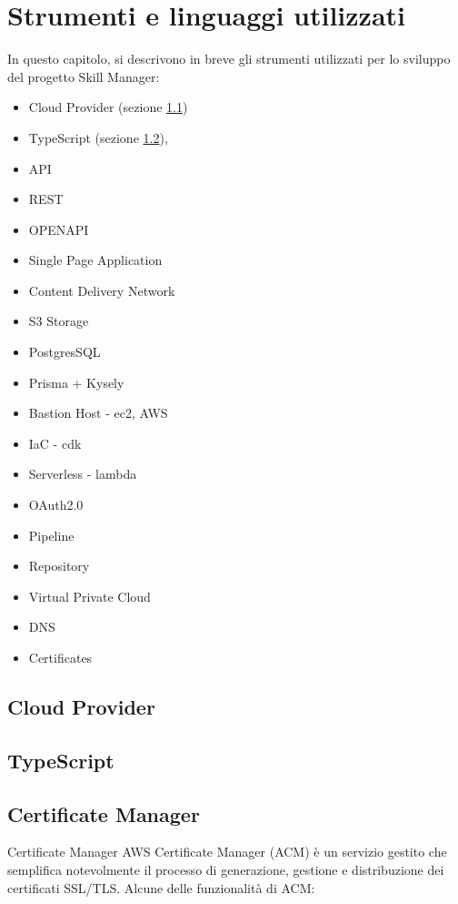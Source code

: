 \chapter{Strumenti e linguaggi utilizzati}
In questo capitolo, si descrivono in breve gli strumenti utilizzati per lo sviluppo del progetto Skill Manager:
\begin{itemize}
    \item Cloud Provider (sezione \ref{CloudProvider})

    \item TypeScript (sezione \ref{typescript}),
    
    \item API
    \item REST
    \item OPENAPI
    \item Single Page Application
    \item Content Delivery Network
    \item S3 Storage
    \item PostgresSQL
    \item Prisma + Kysely
    \item Bastion Host - ec2, AWS
    \item IaC - cdk
    \item Serverless - lambda
    \item OAuth2.0
    \item Pipeline
    \item Repository
    \item Virtual Private Cloud
    \item DNS
    \item Certificates
\end{itemize}
\section{Cloud Provider}
\label{CloudProvider}

\section{TypeScript}
\label{typescript}


\section{Certificate Manager}

Certificate Manager
AWS Certificate Manager (ACM) è un servizio gestito che semplifica notevolmente il processo di generazione, gestione e distribuzione dei certificati SSL/TLS. Alcune delle funzionalità di ACM:

